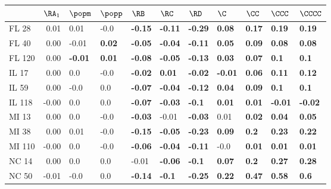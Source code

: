 \begin{tabular}{lrlllllllll}
\toprule
{} &  $\RA_1$ &         $\popm$ &        $\popp$ &           $\RB$ &           $\RC$ &           $\RD$ &            $\C$ &          $\CC$ &          $\CCC$ &         $\CCCC$ \\
\midrule
FL 28   &     0.01 &            0.01 &           -0.0 &  \textbf{-0.15} &  \textbf{-0.11} &  \textbf{-0.29} &   \textbf{0.08} &  \textbf{0.17} &   \textbf{0.19} &   \textbf{0.19} \\
FL 40   &     0.00 &           -0.01 &  \textbf{0.02} &  \textbf{-0.05} &  \textbf{-0.04} &  \textbf{-0.11} &   \textbf{0.05} &  \textbf{0.09} &   \textbf{0.08} &   \textbf{0.08} \\
FL 120  &     0.00 &  \textbf{-0.01} &  \textbf{0.01} &  \textbf{-0.08} &  \textbf{-0.05} &  \textbf{-0.13} &   \textbf{0.03} &  \textbf{0.07} &    \textbf{0.1} &    \textbf{0.1} \\
IL 17   &     0.00 &             0.0 &           -0.0 &  \textbf{-0.02} &   \textbf{0.01} &  \textbf{-0.02} &  \textbf{-0.01} &  \textbf{0.06} &   \textbf{0.11} &   \textbf{0.12} \\
IL 59   &     0.00 &            -0.0 &            0.0 &  \textbf{-0.07} &  \textbf{-0.04} &  \textbf{-0.12} &   \textbf{0.04} &  \textbf{0.09} &    \textbf{0.1} &    \textbf{0.1} \\
IL 118  &    -0.00 &             0.0 &            0.0 &  \textbf{-0.07} &  \textbf{-0.03} &   \textbf{-0.1} &   \textbf{0.01} &  \textbf{0.01} &  \textbf{-0.01} &  \textbf{-0.02} \\
MI 13   &     0.00 &             0.0 &           -0.0 &  \textbf{-0.03} &           -0.01 &  \textbf{-0.03} &            0.01 &  \textbf{0.02} &   \textbf{0.04} &   \textbf{0.05} \\
MI 38   &     0.00 &            0.01 &           -0.0 &  \textbf{-0.15} &  \textbf{-0.05} &  \textbf{-0.23} &   \textbf{0.09} &   \textbf{0.2} &   \textbf{0.23} &   \textbf{0.22} \\
MI 110  &    -0.00 &             0.0 &           -0.0 &  \textbf{-0.06} &  \textbf{-0.04} &  \textbf{-0.11} &            -0.0 &  \textbf{0.01} &   \textbf{0.01} &   \textbf{0.01} \\
NC 14   &     0.00 &             0.0 &            0.0 &           -0.01 &  \textbf{-0.06} &   \textbf{-0.1} &   \textbf{0.07} &   \textbf{0.2} &   \textbf{0.27} &   \textbf{0.28} \\
NC 50   &    -0.01 &            -0.0 &            0.0 &  \textbf{-0.14} &   \textbf{-0.1} &  \textbf{-0.25} &   \textbf{0.22} &  \textbf{0.47} &   \textbf{0.58} &    \textbf{0.6} \\

\end{tabular}
